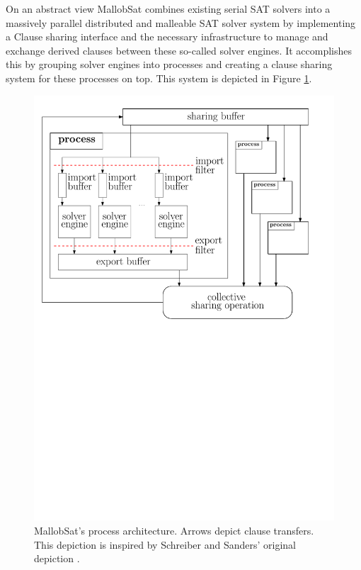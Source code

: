 \documentclass[12pt,a4paper,twoside]{scrartcl}
\numberwithin{equation}{section}
\begin{document}
On an abstract view MallobSat combines existing serial SAT solvers into a massively parallel distributed and malleable SAT solver system by implementing a Clause sharing interface and the necessary infrastructure to manage and exchange derived clauses between these so-called solver engines. It accomplishes this by grouping solver engines into processes and creating a clause sharing system for these processes on top. This system is depicted in Figure \ref{fig:architectureMallob}.

\begin{figure}[!h]
  \center
  \includegraphics[scale=.8]{figures/mallob_architecture.pdf}
  \caption{MallobSat's process architecture. Arrows depict clause transfers. This depiction is inspired by Schreiber and Sanders' original depiction \cite{mallobSat}.}
  \label{fig:architectureMallob}
\end{figure}
\end{document}
